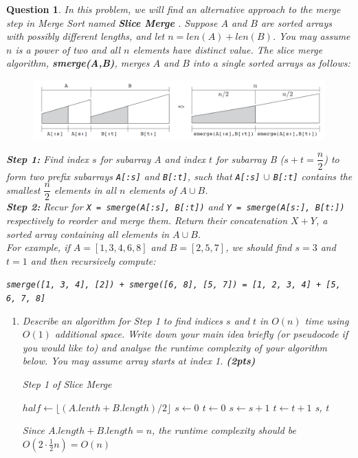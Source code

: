 \documentclass[10.5pt]{article}
\newtheorem{Q}{Question}
\begin{document}
\begin{Q}
In this problem, we will find an alternative approach to the merge step in Merge Sort named \textbf{Slice Merge} . Suppose $A$ and $B$ are sorted arrays with possibly different lengths, and let $n=len(A)+len(B)$. You may assume $n$ is a power of two and all $n$ elements have distinct value. The slice merge algorithm, \textbf{smerge(A,B)}, merges $A$ and $B$ into a single sorted arrays as follows:

\begin{figure}[htbp]
	\centering
	\includegraphics[width=1.0\linewidth]{2}
\end{figure}

\textbf{Step 1:} Find index $s$ for subarray A and index $t$ for subarray B ($s+t=\dfrac{n}{2}$) to form two prefix subarrays \texttt{A[:s]} and \texttt{B[:t]}, such that \texttt{A[:s]} $\cup$ \texttt{B[:t]} contains the smallest $\dfrac{n}{2}$ elements in all $n$ elements of $A\cup B$.\\
 
\textbf{Step 2:} Recur for \texttt{X = smerge(A[:s], B[:t])} and \texttt{Y = smerge(A[s:], B[t:])} respectively to reorder and merge them. Return their concatenation $X+Y$, a sorted array containing all elements in $A\cup B$.\\
 
 For example, if $A=[1, 3, 4, 6, 8]$ and $B=[2, 5, 7]$, we should find $s=3$ and $t=1$ and then recursively compute:
 
\centerline{\texttt{smerge([1, 3, 4], [2]) + smerge([6, 8], [5, 7]) = [1, 2, 3, 4] + [5, 6, 7, 8]}}

\vspace{0.5cm}
\begin{enumerate}[1.]
\item  Describe an algorithm for Step 1 to find indices $s$ and $t$ in $O(n)$ time using $O(1)$ additional space. Write down your main idea briefly (or pseudocode if you would like to) and analyse the runtime complexity of your algorithm below. You may assume array starts at index 1. \textbf{(2pts)}\\
\begin{algorithm}[H]
	\caption{Step 1 of Slice Merge}
	\begin{algorithmic}[1]
			\State $half \gets \lfloor(A.lenth + B.length) / 2 \rfloor$
			\State $s \gets 0$
			\State $t \gets 0$
					\State $s \gets s + 1$
				\Else
					\State $t \gets t + 1$
				\EndIf
			\EndFor
		\State \Return s, t
		\EndFunction
	\end{algorithmic}
\end{algorithm}
\textup{Since} $A.length + B.length = n$\textup{, the runtime complexity should be} $O(2 \cdot\frac12 n) = O(n)$



\end{enumerate}
\end{Q}
\end{document}
